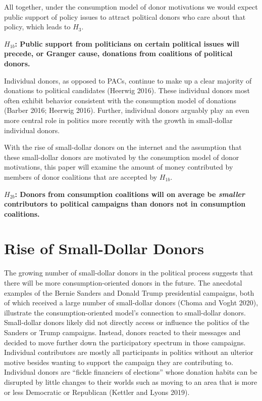 \documentclass[12pt,]{article}
\begin{document}
All together, under the consumption model of donor motivations we would
expect public support of policy issues to attract political donors who
care about that policy, which leads to \(H_{3}\).

\textbf{\(H_{1b}\): Public support from politicians on certain political
issues will precede, or Granger cause, donations from coalitions of
political donors.}

Individual donors, as opposed to PACs, continue to make up a clear
majority of donations to political candidates (Heerwig 2016). These
individual donors most often exhibit behavior consistent with the
consumption model of donations (Barber 2016; Heerwig 2016). Further,
individual donors arguably play an even more central role in politics
more recently with the growth in small-dollar individual donors.

With the rise of small-dollar donors on the internet and the assumption
that these small-dollar donors are motivated by the consumption model of
donor motivations, this paper will examine the amount of money
contributed by members of donor coalitions that are accepted by
\(H_{1b}\).

\textbf{\(H_{2b}\): Donors from consumption coalitions will on average
be \emph{smaller} contributors to political campaigns than donors not in
consumption coalitions.}

\hypertarget{rise-of-small-dollar-donors}{%
\section{Rise of Small-Dollar
Donors}\label{rise-of-small-dollar-donors}}

The growing number of small-dollar donors in the political process
suggests that there will be more consumption-oriented donors in the
future. The anecdotal examples of the Bernie Sanders and Donald Trump
presidential campaigns, both of which received a large number of
small-dollar donors (Choma and Voght 2020), illustrate the
consumption-oriented model's connection to small-dollar donors.
Small-dollar donors likely did not directly access or influence the
politics of the Sanders or Trump campaigns. Instead, donors reacted to
their messages and decided to move further down the participatory
spectrum in those campaigns. Individual contributors are mostly all
participants in politics without an ulterior motive besides wanting to
support the campaign they are contributing to. Individual donors are
``fickle financiers of elections'' whose donation habits can be
disrupted by little changes to their worlds such as moving to an area
that is more or less Democratic or Republican (Kettler and Lyons 2019).
\end{document}
